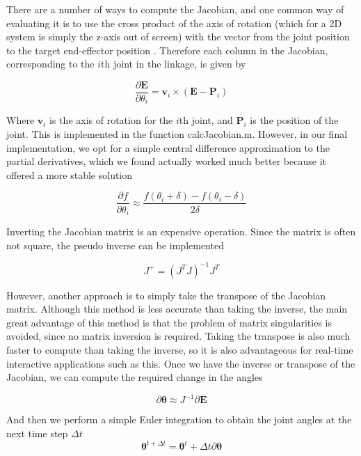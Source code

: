\documentclass[paper=a4, fontsize=11pt]{scrartcl} %
\numberwithin{equation}{section} %
\numberwithin{figure}{section} %
\numberwithin{table}{section} %
\newcommand{\vect}[1]{\mathbf{#1}}
\newcommand{\params}{\boldsymbol{\theta}}
\newcommand{\dn}[1]{\partial{#1}}
\begin{document}
There are a number of ways to compute the Jacobian, and one common way of evaluating it is to use the cross product of the axis of rotation (which for a 2D system is simply the z-axis out of screen) with the vector from the joint position to the target end-effector position \cite{Buss09}. Therefore each column in the Jacobian, corresponding to the $i$th joint in the linkage, is given by

\begin{equation}
\frac{\dn{\vect{E}}}{\dn{\theta_i}} = \vect{v}_i \times (\vect{E} - \vect{P}_i)
\end{equation}

Where $\vect{v}_i$ is the axis of rotation for the $i$th joint, and $\vect{P}_i$ is the position of the joint. This is implemented in the function calcJacobian.m. However, in our final implementation, we opt for a simple central difference approximation to the partial derivatives, which we found actually worked much better because it offered a more stable solution

\begin{equation}
\frac{\dn{f}}{\dn{\theta_i}} \approx \frac{f(\theta_i+\delta) - f(\theta_i-\delta)}{2\delta} 
\end{equation}
 
Inverting the Jacobian matrix is an expensive operation. Since the matrix is often not square, the pseudo inverse can be implemented

\begin{equation}
J^+ = (J^TJ)^{-1}J^T
\end{equation}

However, another approach is to simply take the transpose of the Jacobian matrix. Although this method is less accurate than taking the inverse, the main great advantage of this method is that the problem of matrix singularities is avoided, since no matrix inversion is required. Taking the transpose is also much faster to compute than taking the inverse, so it is also advantageous for real-time interactive applications such as this. Once we have the inverse or transpose of the Jacobian, we can compute the required change in the angles

\begin{equation}
\partial \params \approx J^{-1} \partial \vect{E}
\end{equation}

And then we perform a simple Euler integration to obtain the joint angles at the next time step $\Delta t$
\vspace{1mm}
\begin{equation}
\params^{t+\Delta t} = \params^t + \Delta t \partial \params
\end{equation}
\end{document}
